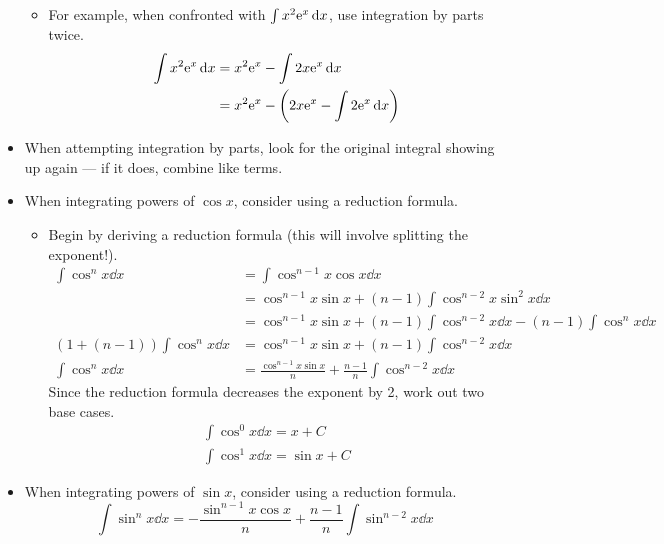 \documentclass[../main.tex]{subfiles}
\begin{document}
\begin{itemize}
\begin{itemize}
        \item For example, when confronted with $\int x^2\e[x]\dd{x}$, use integration by parts twice.
        \begin{align*}
            \int x^2\e[x]\dd{x} &= x^2\e[x]-\int 2x\e[x]\dd{x}\\
            &= x^2\e[x]-\left( 2x\e[x]-\int 2\e[x]\dd{x} \right)
        \end{align*}
    \end{itemize}
    \item When attempting integration by parts, look for the original integral showing up again --- if it does, combine like terms.
    \item When integrating powers of $\cos x$, consider using a reduction formula.
    \begin{itemize}
        \item Begin by deriving a reduction formula (this will involve splitting the exponent!).
        \begin{align*}
            \int\cos^nx\dd{x} &= \int\cos^{n-1}x\cos x\dd{x}\\
            &= \cos^{n-1}x\sin x+(n-1)\int\cos^{n-2}x\sin^2x\dd{x}\\
            &= \cos^{n-1}x\sin x+(n-1)\int\cos^{n-2}x\dd{x}-(n-1)\int\cos^nx\dd{x}\\
            (1+(n-1))\int\cos^nx\dd{x} &= \cos^{n-1}x\sin x+(n-1)\int\cos^{n-2}x\dd{x}\\
            \int\cos^nx\dd{x} &= \frac{\cos^{n-1}x\sin x}{n}+\frac{n-1}{n}\int\cos^{n-2}x\dd{x}
        \end{align*}
        Since the reduction formula decreases the exponent by 2, work out two base cases.
        \begin{gather*}
            \int\cos^0x\dd{x} = x+C\\
            \int\cos^1x\dd{x} = \sin x+C
        \end{gather*}
    \end{itemize}
    \item When integrating powers of $\sin x$, consider using a reduction formula.
    \begin{equation*}
        \int\sin^nx\dd{x} = -\frac{\sin^{n-1}x\cos x}{n}+\frac{n-1}{n}\int\sin^{n-2}x\dd{x}
    \end{equation*}
\end{itemize}
\end{document}
